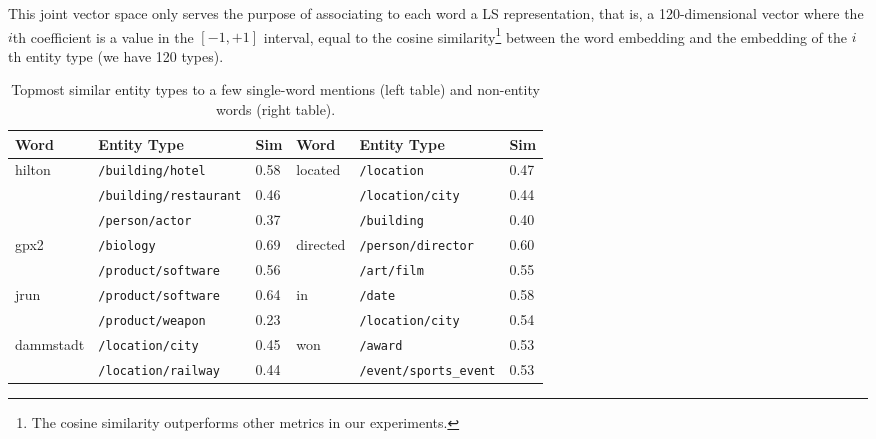 \documentclass[11pt]{article}
\newcommand{\lr}{\textsc{LS}}
\begin{document}
	This joint vector space only serves the purpose of associating to each word a \lr{} representation, that is, a 120-dimensional vector where the $i$th coefficient is a value in the $[-1,+1]$ interval, equal to the cosine similarity\footnote{The cosine similarity outperforms other metrics in our experiments.} between the word embedding  and the embedding of the $i$th entity type (we have 120 types).
	
	
	\begin{table}[!h]
		\begin{center}
			\begin{tabular}{|l|l|l||l|l|l|}
				\hline 
				\bf Word   & \bf Entity Type & \bf Sim & \bf Word   & \bf Entity Type & \bf Sim  \\ 
				\hline
				\multirow{3}{*}{hilton} & \texttt{/building/hotel} & 0.58 & \multirow{3}{*}{located} & \texttt{/location} &  0.47\\
				& \texttt{/building/restaurant} & 0.46 & & \texttt{/location/city} & 0.44\\
				& \texttt{/person/actor} & 0.37 & & \texttt{/building} & 0.40  \\
				\hline	
				\multirow{2}{*}{gpx2} & \texttt{/biology} & 0.69 & \multirow{2}{*}{directed} & \texttt{/person/director} & 0.60 \\
				& \texttt{/product/software} & 0.56 & & \texttt{/art/film} & 0.55\\
				\hline					
				\multirow{2}{*}{jrun} & \texttt{/product/software} & 0.64  & \multirow{2}{*}{in} & \texttt{/date} & 0.58\\
				& \texttt{/product/weapon} & 0.23 & & \texttt{/location/city} & 0.54\\
				\hline
				\multirow{2}{*}{dammstadt} & \texttt{/location/city} & 0.45 & \multirow{2}{*}{won} & \texttt{/award} & 0.53 \\
				& \texttt{/location/railway} & 0.44 & & \texttt{/event/sports\_event} & 0.53 \\	
				\hline
				
			\end{tabular}
			\caption{Topmost similar entity types to a few single-word mentions (left table) and non-entity words (right table).}
			\label{tab.sim}
		\end{center}
	\end{table}
	
\end{document}
